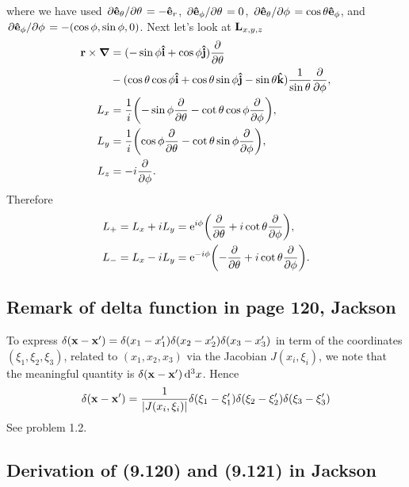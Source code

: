 \documentclass[10pt]{article}
\begin{document}
where we have used $\pdv*{\vu{e}_{\theta}}{\theta} = -\vu{e}_r$, $\pdv*{\vu{e}_{\phi}}{\theta} = 0$, $\pdv*{\vu{e}_{\theta}}{\phi} = \cos{\theta} \vu{e}_{\phi}$,
and $\pdv*{\vu{e}_{\phi}}{\phi} = -(\cos{\phi}, \sin{\phi}, 0)$.
Next let's look at $\vb{L}_{x,y,z}$
\begin{align*}
	\vb{r} \times \grad &= (-\sin{\phi} \vu{i} + \cos{\phi} \vu{j}) \pdv{\theta} \\
	&- (\cos{\theta} \cos{\phi} \vu{i} + \cos{\theta} \sin{\phi} \vu{j} - \sin{\theta} \vu{k}) \frac{1}{\sin{\theta}} \pdv{\phi}, \\
	L_x &= \frac{1}{i}\qty(-\sin{\phi}\pdv{\theta} - \cot{\theta}\cos{\phi}\pdv{\phi}), \\
	L_y &= \frac{1}{i}\qty(\cos{\phi}\pdv{\theta} - \cot{\theta}\sin{\phi}\pdv{\phi}), \\
	L_z &= -i\pdv{\phi}.
\end{align*}
Therefore
\begin{align*}
	L_+ &= L_x + iL_y = {\mathrm{e}}^{i\phi}\qty(\pdv{\theta} + i \cot{\theta} \pdv{\phi}), \\
	L_- &= L_x - iL_y = {\mathrm{e}}^{-i\phi}\qty(-\pdv{\theta} + i \cot{\theta} \pdv{\phi}).
\end{align*}

\subsection{Remark of delta function in page 120, Jackson}

To express $\delta(\vb{x} - \vb{x'}) = \delta(x_1 - x_1')\delta(x_2 - x_2')\delta(x_3 - x_3')$ in term of the coordinates $(\xi_1, \xi_2, \xi_3)$, related to $(x_1,x_2,x_3)$ via the Jacobian $J(x_i,\xi_i)$, we note that the meaningful quantity is $\delta(\vb{x} - \vb{x'}) \dd[3]{x}$.
Hence
\begin{equation}
	\delta(\vb{x} - \vb{x'}) = \frac{1}{\abs{J(x_i,\xi_i)}} \delta(\xi_1 - \xi_1') \delta(\xi_2 - \xi_2') \delta(\xi_3 - \xi_3')
\end{equation}
See problem 1.2.

\subsection{Derivation of (9.120) and (9.121) in Jackson}
\end{document}
